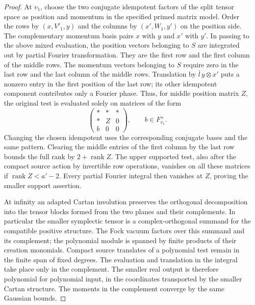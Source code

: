 \begin{proof}
At \(v_1\), choose the two conjugate idempotent factors of the
split tensor space as position and momentum in the specified primed
matrix model. Order the rows by \((x,V'_1,y)\) and the columns
by \((x',W_1,y')\) on the position side. The complementary momentum
basis pairs \(x\) with \(y\) and \(x'\) with \(y'\). In passing to
the above mixed evaluation, the position vectors belonging to \(S\)
are integrated out by partial Fourier transformation. They are the
first row and the first column of the middle rows. The momentum
vectors belonging to \(S\) require zero in the last row and the last
column of the middle rows. Translation by \(\bar l\,y\otimes x'\)
puts a nonzero entry in the first position of the last row; its other
idempotent component contributes only a Fourier phase. Thus, for
middle position matrix \(Z\), the original test is evaluated solely
on matrices of the form
\[
   \begin{pmatrix} *&*&*\\ *&Z&0\\ b&0&0\end{pmatrix},\qquad
                                      b\in F_{v_1}^{\times}.
\]
Changing the chosen idempotent uses the corresponding conjugate
bases and the same pattern. Clearing the middle entries of the
first column by the last row bounds the full rank by
\(2+\operatorname{rank}Z\). The upper supported test, also after
the compact source action by invertible row operations, vanishes
on all these matrices if \(\operatorname{rank}Z<a'-2\).
Every partial Fourier integral then vanishes at \(Z\), proving
the smaller support assertion.

At infinity an adapted Cartan involution preserves the orthogonal
decomposition into the tensor blocks formed from the two planes
and their complements. In particular the smaller symplectic tensor
is a complex-orthogonal summand for the compatible positive
structure. The Fock vacuum factors over this summand and its
complement; the polynomial module is spanned by finite products of
their creation monomials. Compact source translates of a polynomial
test remain in the finite span of fixed degrees. The evaluation and
translation in the integral take place only in the complement.
The smaller real output is therefore polynomial for polynomial
input, in the coordinates transported by the smaller Cartan
structure. The moments in the complement converge by the same
Gaussian bounds.


\end{proof}
